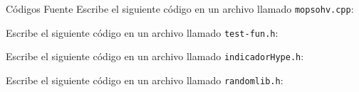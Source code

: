 \begin{chapter}{C\'odigos Fuente }
  Escribe el siguiente c\'odigo en un archivo llamado \texttt{mopsohv.cpp}:
  
  Escribe el siguiente c\'odigo en un archivo llamado \texttt{test-fun.h}:
  
  Escribe el siguiente c\'odigo en un archivo llamado \texttt{indicadorHype.h}:
  
  Escribe el siguiente c\'odigo en un archivo llamado \texttt{randomlib.h}:
  
\end{chapter}